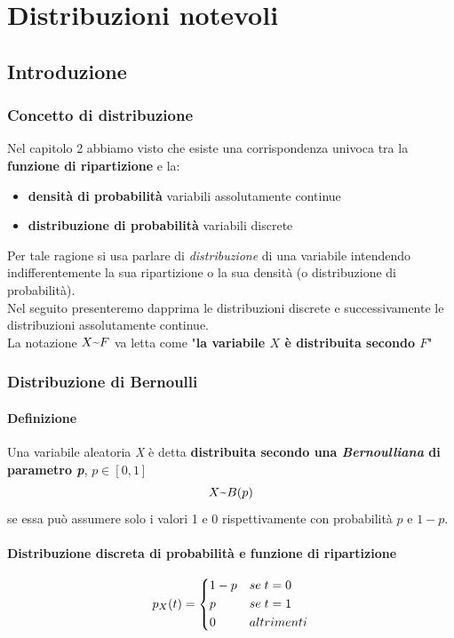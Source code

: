 \chapter[Distribuzioni notevoli]{Distribuzioni notevoli}

\section{Introduzione}

\subsection{Concetto di distribuzione}
Nel capitolo 2 abbiamo visto che esiste una corrispondenza univoca tra la \textbf{funzione di ripartizione} e la:
\begin{itemize}
	\item \textbf{densità di probabilità} \hspace{19mm}variabili assolutamente continue
	\item \textbf{distribuzione di probabilità} \hspace{6mm} variabili discrete
\end{itemize}
Per tale ragione si usa parlare di \textit{distribuzione} di una variabile intendendo indifferentemente la sua ripartizione o la sua densità (o distribuzione di probabilità).\\
Nel seguito presenteremo dapprima le distribuzioni discrete e successivamente le distribuzioni assolutamente continue.\\
La notazione $X \textapprox F$ va letta come "\textbf{la variabile $X$ è distribuita secondo $F$}"

\subsection{Distribuzione di Bernoulli}
\subsubsection{Definizione}
Una variabile aleatoria \textit{X} è detta \textbf{distribuita secondo una \textit{Bernoulliana} di parametro \textit{p}}, $p \in [0,1]$ 
\begin{equation}
	X \textapprox B(p)
\end{equation}
se essa può assumere solo i valori 1 e 0 rispettivamente con probabilità $p$ e $1 - p$.

\subsubsection{Distribuzione discreta di probabilità e funzione di ripartizione}
\begin{equation}
p_X(t) = 
	\begin{dcases}
		1 - p & se \; t = 0 \\
		p & se \; t = 1\\
		0 & altrimenti
	\end{dcases}
\end{equation}

